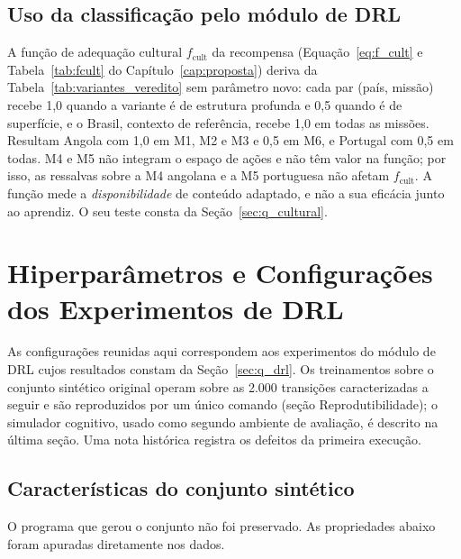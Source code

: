 \section*{Uso da classificação pelo módulo de DRL}
\label{sec:variantes_fcult}

A função de adequação cultural $f_{\text{cult}}$ da recompensa (Equação~\ref{eq:f_cult} e Tabela~\ref{tab:fcult} do Capítulo~\ref{cap:proposta}) deriva da Tabela~\ref{tab:variantes_veredito} sem parâmetro novo: cada par (país, missão) recebe 1,0 quando a variante é de estrutura profunda e 0,5 quando é de superfície, e o Brasil, contexto de referência, recebe 1,0 em todas as missões. Resultam Angola com 1,0 em M1, M2 e M3 e 0,5 em M6, e Portugal com 0,5 em todas. M4 e M5 não integram o espaço de ações e não têm valor na função; por isso, as ressalvas sobre a M4 angolana e a M5 portuguesa não afetam $f_{\text{cult}}$. A função mede a \emph{disponibilidade} de conteúdo adaptado, e não a sua eficácia junto ao aprendiz. O seu teste consta da Seção~\ref{sec:q_cultural}.



\chapter{Hiperparâmetros e Configurações dos Experimentos de DRL}
\label{apendice:experimentos}

As configurações reunidas aqui correspondem aos experimentos do módulo de DRL cujos resultados constam da Seção~\ref{sec:q_drl}. Os treinamentos sobre o conjunto sintético original operam sobre as 2.000 transições caracterizadas a seguir e são reproduzidos por um único comando (seção Reprodutibilidade); o simulador cognitivo, usado como segundo ambiente de avaliação, é descrito na última seção. Uma nota histórica registra os defeitos da primeira execução.

\section*{Características do conjunto sintético}

O programa que gerou o conjunto não foi preservado. As propriedades abaixo foram apuradas diretamente nos dados.

